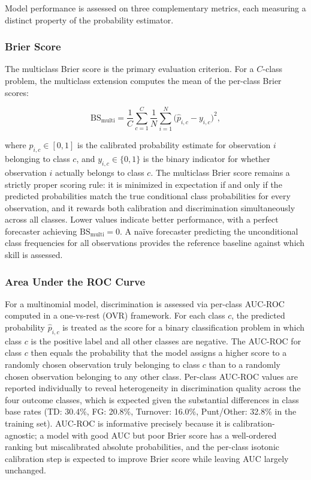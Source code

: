 Model performance is assessed on three complementary metrics, each measuring
a distinct property of the probability estimator.

\subsubsection{Brier Score}

The multiclass Brier score \parencite{brier1950verification} is the primary
evaluation criterion. For a $C$-class problem, the multiclass extension
computes the mean of the per-class Brier scores:

\begin{equation}
  \mathrm{BS}_{\mathrm{multi}} = \frac{1}{C} \sum_{c=1}^{C}
    \frac{1}{N} \sum_{i=1}^{N}
    \bigl(\hat{p}_{i,c} - y_{i,c}\bigr)^2,
\end{equation}

where $\hat{p}_{i,c} \in [0,1]$ is the calibrated probability estimate for
observation $i$ belonging to class $c$, and $y_{i,c} \in \{0,1\}$ is the
binary indicator for whether observation $i$ actually belongs to class $c$.
The multiclass Brier score remains a strictly proper scoring rule: it is
minimized in expectation if and only if the predicted probabilities match the
true conditional class probabilities for every observation, and it rewards
both calibration and discrimination simultaneously across all classes. Lower
values indicate better performance, with a perfect forecaster achieving
$\mathrm{BS}_{\mathrm{multi}} = 0$. A na\"{i}ve forecaster predicting the
unconditional class frequencies for all observations provides the reference
baseline against which skill is assessed.

\subsubsection{Area Under the ROC Curve}

For a multinomial model, discrimination is assessed via per-class AUC-ROC
computed in a one-vs-rest (OVR) framework. For each class $c$, the predicted
probability $\hat{p}_{i,c}$ is treated as the score for a binary classification
problem in which class $c$ is the positive label and all other classes are
negative. The AUC-ROC for class $c$ then equals the probability that the model
assigns a higher score to a randomly chosen observation truly belonging to class
$c$ than to a randomly chosen observation belonging to any other class.
Per-class AUC-ROC values are reported individually to reveal heterogeneity in
discrimination quality across the four outcome classes, which is expected given
the substantial differences in class base rates (TD: 30.4\%, FG: 20.8\%,
Turnover: 16.0\%, Punt/Other: 32.8\% in the training set). AUC-ROC is
informative precisely because it is calibration-agnostic; a model with good AUC
but poor Brier score has a well-ordered ranking but miscalibrated absolute
probabilities, and the per-class isotonic calibration step is expected to
improve Brier score while leaving AUC largely unchanged.

